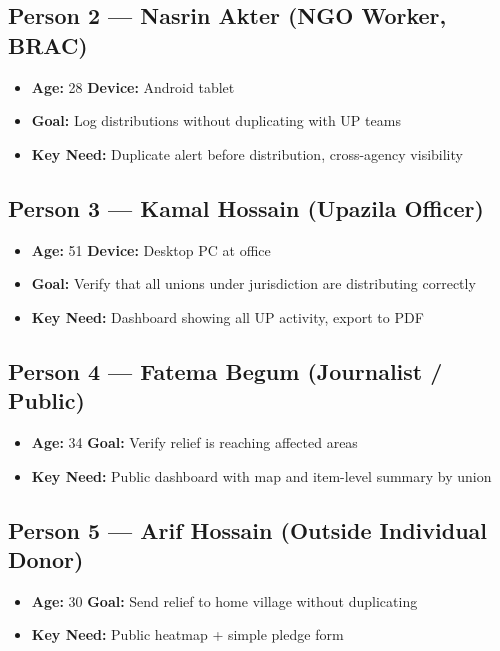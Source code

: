 \subsection{Person 2 --- Nasrin Akter (NGO Worker, BRAC)}
\begin{itemize}[nosep]
    \item \textbf{Age:} 28 \textbar{} \textbf{Device:} Android tablet
    \item \textbf{Goal:} Log distributions without duplicating with UP teams
    \item \textbf{Key Need:} Duplicate alert before distribution, cross-agency visibility
\end{itemize}

\subsection{Person 3 --- Kamal Hossain (Upazila Officer)}
\begin{itemize}[nosep]
    \item \textbf{Age:} 51 \textbar{} \textbf{Device:} Desktop PC at office
    \item \textbf{Goal:} Verify that all unions under jurisdiction are distributing correctly
    \item \textbf{Key Need:} Dashboard showing all UP activity, export to PDF
\end{itemize}

\subsection{Person 4 --- Fatema Begum (Journalist / Public)}
\begin{itemize}[nosep]
    \item \textbf{Age:} 34 \textbar{} \textbf{Goal:} Verify relief is reaching affected areas
    \item \textbf{Key Need:} Public dashboard with map and item-level summary by union
\end{itemize}

\subsection{Person 5 --- Arif Hossain (Outside Individual Donor)}
\begin{itemize}[nosep]
    \item \textbf{Age:} 30 \textbar{} \textbf{Goal:} Send relief to home village without duplicating
    \item \textbf{Key Need:} Public heatmap + simple pledge form
\end{itemize}

